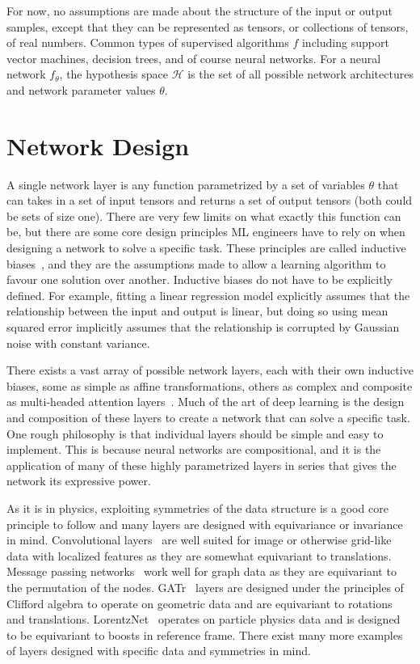 For now, no assumptions are made about the structure of the input or output samples, except that they can be represented as tensors, or collections of tensors, of real numbers.
Common types of supervised algorithms $f$ including support vector machines, decision trees, and of course neural networks.
For a neural network $f_{\theta}$, the hypothesis space $\mathcal{H}$ is the set of all possible network architectures and network parameter values $\theta$.

\section{Network Design}

A single network layer is any function parametrized by a set of variables $\theta$ that can takes in a set of input tensors and returns a set of output tensors (both could be sets of size one).
There are very few limits on what exactly this function can be, but there are some core design principles \Gls{ML} engineers have to rely on when designing a network to solve a specific task.
These principles are called inductive biases~\cite{InductiveBiases1, InductiveBiases2}, and they are the assumptions made to allow a learning algorithm to favour one solution over another.
Inductive biases do not have to be explicitly defined.
For example, fitting a linear regression model explicitly assumes that the relationship between the input and output is linear, but doing so using mean squared error implicitly assumes that the relationship is corrupted by Gaussian noise with constant variance.

There exists a vast array of possible network layers, each with their own inductive biases, some as simple as affine transformations, others as complex and composite as multi-headed attention layers~\cite{Attention}.
Much of the art of deep learning is the design and composition of these layers to create a network that can solve a specific task.
One rough philosophy is that individual layers should be simple and easy to implement.
This is because neural networks are compositional, and it is the application of many of these highly parametrized layers in series that gives the network its expressive power.

As it is in physics, exploiting symmetries of the data structure is a good core principle to follow and many layers are designed with equivariance or invariance in mind.
Convolutional layers~\cite{DeepLearning} are well suited for image or otherwise grid-like data with localized features as they are somewhat equivariant to translations.
Message passing networks~\cite{NeuralMessagePassing} work well for graph data as they are equivariant to the permutation of the nodes.
GATr~\cite{GeometricAlgebraTransformer} layers are designed under the principles of Clifford algebra to operate on geometric data and are equivariant to rotations and translations.
LorentzNet~\cite{LorentzNet} operates on particle physics data and is designed to be equivariant to boosts in reference frame.
There exist many more examples of layers designed with specific data and symmetries in mind.

